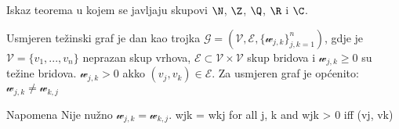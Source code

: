 

\begin{thm}
Iskaz teorema u kojem se javljaju skupovi  $\N$, $\Z$, $\Q$, $\R$ i $\C$.
\end{thm}
Usmjeren težinski graf je dan kao trojka $\mathcal{G} = ( \mathcal{V}, \mathcal{E}, \{ \mathcal{w}_{j,k} \}_{j,k=1}^{n} )$, gdje je $\mathcal{V} = \{v_1,...,v_n\}$ neprazan skup vrhova, $\mathcal{E} \subset \mathcal{V} \times \mathcal{V} $ skup bridova i $\mathcal{w}_{j,k} \geq 0 $ su težine bridova. $\mathcal{w}_{j,k} > 0$  akko $(v_j,v_k) \in \mathcal{E}$. Za usmjeren graf je općenito: $\mathcal{w}_{j,k} \neq \mathcal{w}_{k,j}$ 

Napomena
Nije nužno $\mathcal{w}_{j,k} = \mathcal{w}_{k,j}$.
wjk = wkj for all j, k and wjk > 0
iff (vj, vk) 